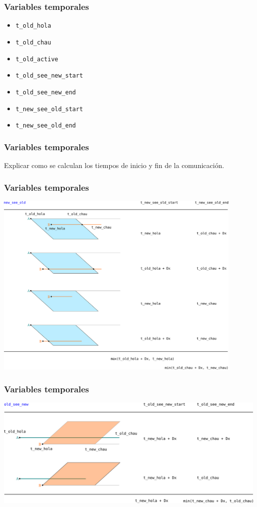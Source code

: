 \documentclass[handout]{beamer}
\theoremstyle{plain}
\theoremstyle{definition}
\theoremstyle{remark}
\begin{document}
\begin{frame}\frametitle{Variables temporales}

   \begin{itemize}
      \item \texttt{t\_old\_hola}
      \item \texttt{t\_old\_chau}          
      \item \texttt{t\_old\_active}        
      \item \texttt{t\_old\_see\_new\_start} 
      \item \texttt{t\_old\_see\_new\_end}   
      \item \texttt{t\_new\_see\_old\_start} 
      \item \texttt{t\_new\_see\_old\_end}   
   \end{itemize}

\end{frame}  %

\begin{frame}\frametitle{Variables temporales}

Explicar como se calculan los tiempos de inicio y fin de la comunicación.

\end{frame}  %

             
\begin{frame}\frametitle{Variables temporales}
   \centering
   \includegraphics[width=0.9\textwidth]{times1.png}
\end{frame}  %

 
\begin{frame}\frametitle{Variables temporales}
   \centering
   \includegraphics[width=\textwidth]{times2.png}
\end{frame}  %
\end{document}
